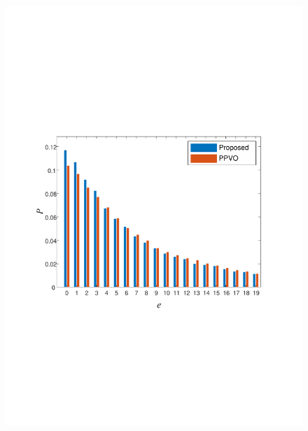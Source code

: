 \documentclass[review,3p,10pt,sort&compress]{elsarticle}
\begin{document}
\begin{figure}[t]
{\begin{minipage}[t]{0.4\linewidth}
    \includegraphics[width=1\textwidth]{figures/Comp4Baboon.pdf}
    \end{minipage}
}
\end{figure}
\end{document}
